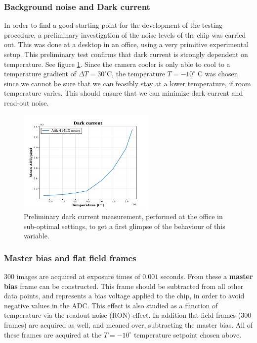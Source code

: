\documentclass[../main.tex]{subfiles}
\begin{document}
		\subsubsection{Background noise and Dark current}
		In order to find a good starting point for the development of the testing procedure, a preliminary investigation of the noise levels of the chip was carried out. This was done at a desktop in an office, using a very primitive experimental setup. This preliminary test confirms that dark current is strongly dependent on temperature. See figure \ref{fig:dcprelim}. Since the camera cooler is only able to cool to a temperature gradient of $\Delta T = 30 ^\circ $C, the temperature $T = -10 ^\circ$ C was chosen since we cannot be sure that we can feasibly stay at a lower temperature, if room temperature varies. This should ensure that we can minimize dark current and read-out noise.
		\begin{figure}
			\centering
			\includegraphics[width=0.6\textwidth]{dark_current_versus_temperature.pdf}
			\caption{Preliminary dark current measurement, performed at the office in sub-optimal settings, to get a first glimpse of the behaviour of this variable.}
			\label{fig:dcprelim}
		\end{figure}
		
		\subsubsection{Master bias and flat field frames}
		$300$ images are acquired at exposure times of $0.001$ seconds. From these a \textbf{master bias} frame can be constructed. This frame should be subtracted from all other data points, and represents a bias voltage applied to the chip, in order to avoid negative values in the ADC. This effect is also studied as a function of temperature via the readout noise (RON) effect. 
		In addition flat field frames ($300$ frames) are acquired as well, and meaned over, subtracting the master bias. All of these frames are acquired at the $T= -10^\circ$ temperature setpoint chosen above.
		
\end{document}
